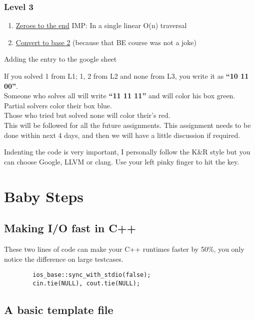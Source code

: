 \documentclass[13pt, oneside, a4paper]{book}
\begin{document}
\subsection{Level 3}
\begin{enumerate}
        \item \href{https://leetcode.com/problems/move-zeroes/}{Zeroes to the end} IMP: In a single linear O(n) traversal
        \item \href{https://leetcode.com/problems/convert-to-base-2/}{Convert to base 2} (because that BE course was not a joke)
\end{enumerate}

Adding the entry to the google sheet

If you solved 1 from L1; 1, 2 from L2 and none from L3, you write it as \textbf{``10 11 00''}.\\
Someone who solves all will write \textbf{``11 11 11''} and will color his box green.\\
Partial solvers color their box blue.\\
Those who tried but solved none will color their's red.\\

This will be followed for all the future assignments. This assignment needs to be done within next 4 days, and then we will have a little discussion if required.

Indenting the code is very important, I personally follow the K\&R style but you can choose Google, LLVM or clang. Use your left pinky finger to hit the \keys{\tab} key.

\clearpage
 
\chapter{Baby Steps}
\section{Making I/O fast in C++}
These two lines of code can make your C++ runtimes faster by 50\%, you only notice
the difference on large testcases.

\begin{verbatim}
        ios_base::sync_with_stdio(false);
        cin.tie(NULL), cout.tie(NULL);
\end{verbatim}

\section{A basic template file}
\end{document}
